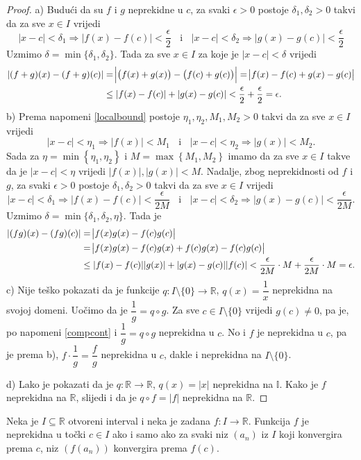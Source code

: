 \begin{proof}
a) Budući da su $f$ i $g$ neprekidne u $c$, za svaki $\epsilon>0$ postoje $\delta_1, \delta_2>0$ takvi da za sve $x\in I$ vrijedi
$$|x-c|<\delta_1\Longrightarrow |f(x)-f(c)|<\dfrac{\epsilon}{2}\;\;\text{ i }\;\; |x-c|<\delta_2\Longrightarrow |g(x)-g(c)|<\dfrac{\epsilon}{2}$$
Uzmimo $\delta=\min\{\delta_1, \delta_2\}$. Tada za sve $x\in I$ za koje je $|x-c|<\delta$ vrijedi
\begin{align*}
|(f+g)(x)-(f+g)(c)|&=\abs{\left(f(x)+g(x)\right)-\left(f(c)+g(c)\right)}=\abs{f(x)-f(c)+g(x)-g(c)}\\
&\leq |f(x)-f(c)|+|g(x)-g(c)|<\dfrac{\epsilon}{2}+\dfrac{\epsilon}{2}=\epsilon.
\end{align*}
b) Prema napomeni \ref{localbound} postoje $\eta_1, \eta_2, M_1, M_2>0$ takvi da za sve $x\in I$ vrijedi
$$|x-c|<\eta_1\Longrightarrow |f(x)|<M_1\;\;\text{ i }\;\; |x-c|<\eta_2\Longrightarrow |g(x)|<M_2.$$
Sada za $\eta=\min\left\{\eta_1, \eta_2\right\}$ i $M=\max\left\{M_1, M_2\right\}$ imamo da za sve $x\in I$ takve da je $|x-c|<\eta$ vrijedi $|f(x)|, |g(x)|<M$. Nadalje, zbog neprekidnosti od $f$ i $g$, za svaki $\epsilon>0$ postoje $\delta_1, \delta_2>0$ takvi da za sve $x\in I$ vrijedi
$$|x-c|<\delta_1\Longrightarrow |f(x)-f(c)|<\dfrac{\epsilon}{2M}\;\;\text{ i }\;\; |x-c|<\delta_2\Longrightarrow |g(x)-g(c)|<\dfrac{\epsilon}{2M}.$$
Uzmimo $\delta=\min\{\delta_1, \delta_2, \eta\}$. Tada je
\begin{align*}
|(fg)(x)-(fg)(c)|&=\abs{f(x)g(x)-f(c)g(c)}\\
&=\abs{f(x)g(x)-f(c)g(x)+f(c)g(x)-f(c)g(c)}\\
&\leq |f(x)-f(c)||g(x)|+|g(x)-g(c)||f(c)|<\dfrac{\epsilon}{2M}\cdot M+\dfrac{\epsilon}{2M}\cdot M=\epsilon.
\end{align*}
c) Nije teško pokazati da je funkcije $q : I\setminus\{0\}\to \mathbb{R}$, $q(x)=\dfrac{1}{x}$ neprekidna na svojoj domeni. Uočimo da je $\dfrac{1}{g}=q\circ g$. Za sve $c\in I\setminus\{0\}$ vrijedi $g(c)\neq 0$, pa je, po napomeni \ref{compcont} i $\dfrac{1}{g}=q\circ g$ neprekidna u $c$. No i $f$ je neprekidna u $c$, pa je prema b), $f\cdot \dfrac{1}{g}=\dfrac{f}{g}$ neprekidna u $c$, dakle i neprekidna na $I\setminus\{0\}$.

d) Lako je pokazati da je $q : \mathbb{R}\to \mathbb{R}$, $q(x)=|x|$ neprekidna na $\mathbb{I}$. Kako je $f$ neprekidna na $\mathbb{R}$, slijedi i da je $q\circ f=|f|$ neprekidna na $\mathbb{R}$.
\end{proof}
\begin{remark}
Neka je $I\subseteq \mathbb{R}$ otvoreni interval i neka je zadana $f : I\to \mathbb{R}$. Funkcija $f$ je neprekidna u točki $c\in I$ ako i samo ako za svaki niz $(a_n)$ iz $I$ koji konvergira prema $c$, niz $\left(f(a_n)\right)$ konvergira prema $f(c)$.
\end{remark}

